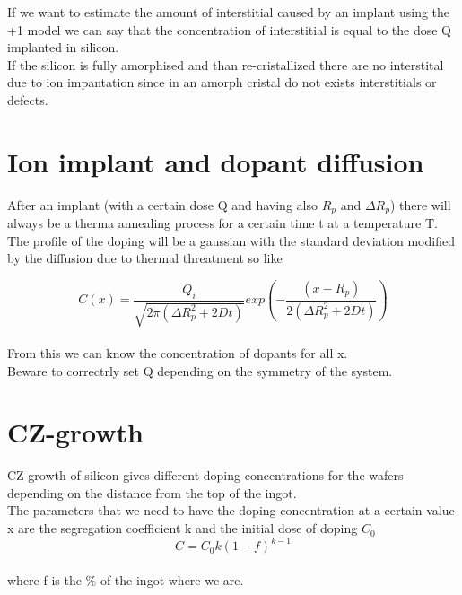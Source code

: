 \vspace{6mm}

If we want to estimate the amount of interstitial caused by an implant using the +1 model we can say that the concentration of interstitial is equal to the dose Q implanted in silicon.\\
If the silicon is fully amorphised and than re-cristallized there are no interstital due to ion impantation since in an amorph cristal do not exists interstitials or defects.\\


\section{Ion implant and dopant diffusion}

After an implant (with a certain dose Q and having also $R_p$ and $\Delta R_p$) there will always be a therma annealing process for a certain time t at a temperature T.\\
The profile of the doping will be a gaussian with the standard deviation modified by the diffusion due to thermal threatment so like

\begin{equation}
C(x)=\frac{Q_i}{\sqrt{2\pi (\Delta R_p^2+2Dt)}}exp\left(-\frac{(x-R_p)}{2(\Delta R_p^2+2Dt)}\right)
\end{equation} 
\\
From this we can know the concentration of dopants for all x.\\
Beware to correctrly set Q depending on the symmetry of the system.\\


\section{CZ-growth}
CZ growth of silicon gives different doping concentrations for the wafers depending on the distance from the top of the ingot.\\
The parameters that we need to have the doping concentration at a certain value x are the segregation coefficient k and the initial dose of doping $C_0$
\begin{equation}
C=C_0 k (1-f)^{k-1}
\end{equation}
\\
where f is the \% of the ingot where we are.

